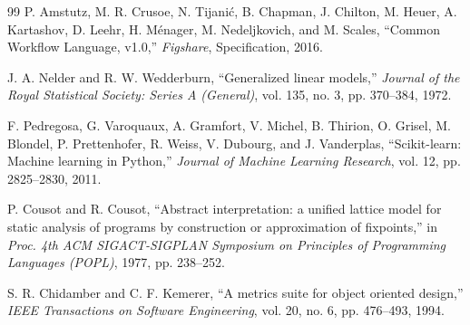 \documentclass[12pt,a4paper]{article}
\begin{document}
\begin{thebibliography}{99}
P. Amstutz, M. R. Crusoe, N. Tijani{\'c}, B. Chapman, J. Chilton, M. Heuer, A. Kartashov, D. Leehr, H. M{\'e}nager, M. Nedeljkovich, and M. Scales,
``Common Workflow Language, v1.0,''
\textit{Figshare}, Specification, 2016.

J. A. Nelder and R. W. Wedderburn,
``Generalized linear models,''
\textit{Journal of the Royal Statistical Society: Series A (General)}, vol. 135, no. 3, pp. 370--384, 1972.

F. Pedregosa, G. Varoquaux, A. Gramfort, V. Michel, B. Thirion, O. Grisel, M. Blondel, P. Prettenhofer, R. Weiss, V. Dubourg, and J. Vanderplas,
``Scikit-learn: Machine learning in Python,''
\textit{Journal of Machine Learning Research}, vol. 12, pp. 2825--2830, 2011.

P. Cousot and R. Cousot,
``Abstract interpretation: a unified lattice model for static analysis of programs by construction or approximation of fixpoints,''
in \textit{Proc. 4th ACM SIGACT-SIGPLAN Symposium on Principles of Programming Languages (POPL)}, 1977, pp. 238--252.

S. R. Chidamber and C. F. Kemerer,
``A metrics suite for object oriented design,''
\textit{IEEE Transactions on Software Engineering}, vol. 20, no. 6, pp. 476--493, 1994.

\end{thebibliography}
\end{document}
